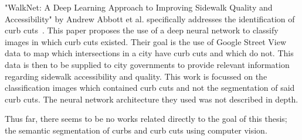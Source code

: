 "WalkNet: A Deep Learning Approach to Improving Sidewalk Quality and Accessibility" by Andrew Abbott et al. specifically addresses the identification of curb cuts~\cite{walknet}.
This paper proposes the use of a deep neural network to classify images in which curb cuts existed.
Their goal is the use of Google Street View data to map which intersections in a city have curb cuts and which do not.
This data is then to be supplied to city governments to provide relevant information regarding sidewalk accessibility and quality.
This work is focussed on the classification images which contained curb cuts and not the segmentation of said curb cuts. The neural network architecture they used was not described in depth.

Thus far, there seems to be no works related directly to the goal of this thesis; the semantic segmentation of curbs and curb cuts using computer vision.
